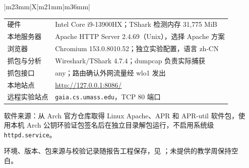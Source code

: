 \documentclass[UTF8,fontset=fandol,zihao=-4]{ctexart}
\newcommand{\code}[1]{\texttt{#1}}
\begin{document}
\begin{tabularx}{\textwidth}{|m{23mm}|X|m{21mm}|m{36mm}|}
{\begin{minipage}{\linewidth}
\begin{tabularx}{\linewidth}{@{}lX@{}}
    硬件 & Intel Core i9-13900HX；TShark 检测内存 31,775 MiB\\
    本地服务器 & Apache HTTP Server 2.4.69（Unix），选择 Apache 方案\\
    浏览器 & Chromium 153.0.8010.52；独立实验配置，语言 zh-CN\\
    抓包与分析 & Wireshark/TShark 4.7.4；dumpcap 负责实际捕获\\
    抓包接口 & any；路由确认外网流量经 wlo1 发出\\
    本地站点 & \url{http://127.0.0.1:8086/}\\
    远程实验站点 & \code{gaia.cs.umass.edu}，TCP 80 端口
  \end{tabularx}
  \par 软件来源：从 Arch 官方仓库取得 Linux Apache、APR 和 APR-util 软件包，使用本机 Arch 公钥环验证包签名后在独立目录解包运行，不启用系统级 \code{httpd.service}。
  \par 环境、版本、包来源与校验记录随报告工程保存，见 ；未提供的教学周保持空白。
  \vspace{2mm}\end{minipage}}\\\hline
\end{tabularx}
\end{document}
